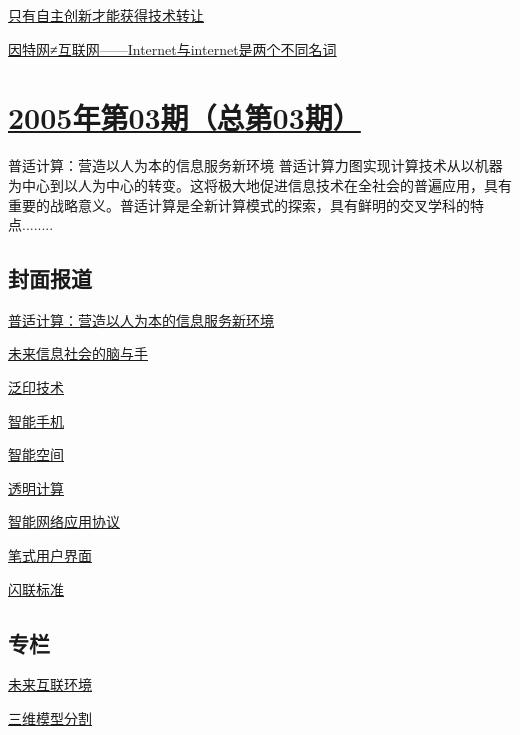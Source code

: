 \documentclass[a4paper]{article}
\begin{document}
\href{http://history.ccf.org.cn/resources/1190201776262/2010/04/15/004086.pdf}{只有自主创新才能获得技术转让}

\href{http://history.ccf.org.cn/resources/1190201776262/2010/04/15/004087.pdf}{因特网≠互联网——Internet与internet是两个不同名词}


\section{\href{http://history.ccf.org.cn/sites/ccf/jsjtbbd.jsp?contentId=2542567628926}{\textbf{2005年第03期（总第03期）}}}
普适计算：营造以人为本的信息服务新环境 普适计算力图实现计算技术从以机器为中心到以人为中心的转变。这将极大地促进信息技术在全社会的普遍应用，具有重要的战略意义。普适计算是全新计算模式的探索，具有鲜明的交叉学科的特点........
\subsection{封面报道}
\href{http://history.ccf.org.cn/resources/1190201776262/2010/04/15/003018.pdf}{普适计算：营造以人为本的信息服务新环境}

\href{http://history.ccf.org.cn/resources/1190201776262/2010/04/15/003021.pdf}{未来信息社会的脑与手}

\href{http://history.ccf.org.cn/resources/1190201776262/2010/04/15/003024.pdf}{泛印技术}

\href{http://history.ccf.org.cn/resources/1190201776262/2010/04/15/003026.pdf}{智能手机}

\href{http://history.ccf.org.cn/resources/1190201776262/2010/04/15/003029.pdf}{智能空间}

\href{http://history.ccf.org.cn/resources/1190201776262/2010/04/15/003033.pdf}{透明计算}

\href{http://history.ccf.org.cn/resources/1190201776262/2010/04/15/003035.pdf}{智能网络应用协议}

\href{http://history.ccf.org.cn/resources/1190201776262/2010/04/15/003037.pdf}{笔式用户界面}

\href{http://history.ccf.org.cn/resources/1190201776262/2010/04/15/003043.pdf}{闪联标准}

\subsection{专栏}
\href{http://history.ccf.org.cn/resources/1190201776262/2010/04/15/003050.pdf}{未来互联环境}

\href{http://history.ccf.org.cn/resources/1190201776262/2010/04/15/003058.pdf}{三维模型分割}
\end{document}
